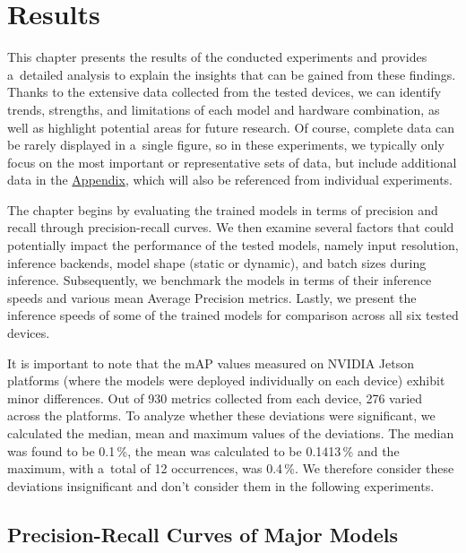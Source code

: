 \chapter{Results}
\label{Results}

This chapter presents the results of the conducted experiments and provides
a~detailed analysis to explain the insights that can be gained from these
findings. Thanks to the extensive data collected from the tested devices, we can
identify trends, strengths, and limitations of each model and hardware
combination, as well as highlight potential areas for future research. Of
course, complete data can be rarely displayed in a~single figure, so in these
experiments, we typically only focus on the most important or representative sets
of data, but include additional data in the \hyperref[Appendix]{Appendix}, which
will also be referenced from individual experiments.

The chapter begins by evaluating the trained models in terms of precision and
recall through precision-recall curves. We then examine several factors that
could potentially impact the performance of the tested models, namely input
resolution, inference backends, model shape (static or dynamic), and batch sizes
during inference. Subsequently, we benchmark the models in terms of their
inference speeds and various mean Average Precision metrics. Lastly, we present
the inference speeds of some of the trained models for comparison across all six
tested devices.

It is important to note that the mAP values measured on NVIDIA Jetson platforms
(where the models were deployed individually on each device) exhibit minor
differences. Out of 930 metrics collected from each device, 276 varied across
the platforms. To analyze whether these deviations were significant, we
calculated the median, mean and maximum values of the deviations. The median was
found to be 0.1\,\%, the mean was calculated to be 0.1413\,\% and the maximum,
with a~total of 12 occurrences, was 0.4\,\%. We therefore consider these
deviations insignificant and don't consider them in the following experiments.



\section{Precision-Recall Curves of Major Models}


